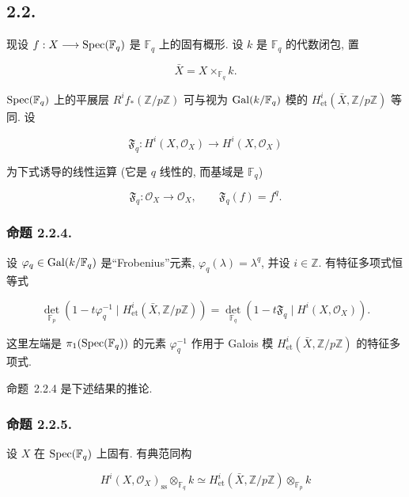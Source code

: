 \subsection*{2.2.}
现设 $f:X\longrightarrow\operatorname{Spec}(\mathbb F_q)$ 是 $\mathbb F_q$ 上的固有概形.
设 $k$ 是 $\mathbb F_q$ 的代数闭包, 置

\begin{equation}\tag{2.2.1}
\bar X=X\times_{\mathbb F_q}k.
\end{equation}

$\operatorname{Spec}(\mathbb F_q)$ 上的平展层 $R^if_*(\mathbb Z/p\mathbb Z)$
可与视为 $\operatorname{Gal}(k/\mathbb F_q)$ 模的
$H^i_{\mathrm{et}}(\bar X,\mathbb Z/p\mathbb Z)$ 等同. 设

\begin{equation}\tag{2.2.2}
\mathfrak F_q:H^i(X,\mathcal O_X)\longrightarrow H^i(X,\mathcal O_X)
\end{equation}

为下式诱导的线性运算 (它是 $q$ 线性的, 而基域是 $\mathbb F_q$)

\begin{equation}\tag{2.2.3}
\mathfrak F_q:\mathcal O_X\longrightarrow\mathcal O_X,
\qquad \mathfrak F_q(f)=f^q.
\end{equation}

\subsubsection*{命题 2.2.4.}
设 $\varphi_q\in\operatorname{Gal}(k/\mathbb F_q)$ 是“Frobenius”元素,
$\varphi_q(\lambda)=\lambda^q$, 并设 $i\in\mathbb Z$. 有特征多项式恒等式

\begin{equation}\tag{2.2.4.1}
\det_{\mathbb F_p}\!\left(
1-t\varphi_q^{-1}\mid H^i_{\mathrm{et}}(\bar X,\mathbb Z/p\mathbb Z)
\right)
=
\det_{\mathbb F_q}\!\left(
1-t\mathfrak F_q\mid H^i(X,\mathcal O_X)
\right).
\end{equation}

这里左端是 $\pi_1(\operatorname{Spec}(\mathbb F_q))$ 的元素 $\varphi_q^{-1}$
作用于 Galois 模 $H^i_{\mathrm{et}}(\bar X,\mathbb Z/p\mathbb Z)$ 的特征多项式.

命题~2.2.4 是下述结果的推论.

\subsubsection*{命题 2.2.5.}
设 $X$ 在 $\operatorname{Spec}(\mathbb F_q)$ 上固有. 有典范同构

\begin{equation}\tag{2.2.6}
H^i(X,\mathcal O_X)_{\mathrm{ss}}\otimes_{\mathbb F_q}k
\simeq
H^i_{\mathrm{et}}(\bar X,\mathbb Z/p\mathbb Z)
\otimes_{\mathbb F_p}k
\end{equation}

